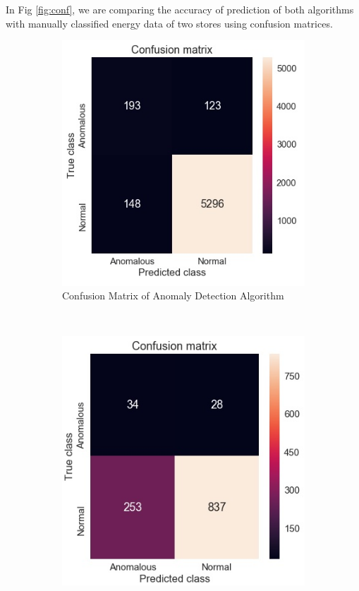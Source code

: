 \documentclass[conference]{IEEEtran}
\begin{document}
In Fig \ref{fig:conf}, we are comparing the accuracy of prediction of both algorithms with manually classified energy data of two stores using confusion matrices. 
\begin{figure}[H]
	\begin{subfigure}[h]{0.3\textwidth}
		\includegraphics[width=\linewidth]{conf_anomaly.jpg}
		\caption{Confusion Matrix of Anomaly Detection Algorithm}
		\label{fig:boat1}
	\end{subfigure}
	~ %
	\begin{subfigure}[h]{0.3\textwidth}
		\includegraphics[width=\linewidth]{Conf_autoencoder.jpg}

\end{subfigure}
\end{figure}
\end{document}
